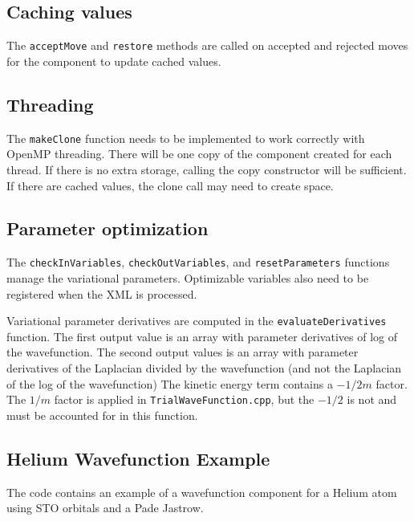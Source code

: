 \subsection{Caching values}
The \texttt{acceptMove} and \texttt{restore} methods are called on accepted and rejected moves for
the component to update cached values.


\subsection{Threading}
The \texttt{makeClone} function needs to be implemented to work correctly with OpenMP threading.
There will be one copy of the component created for each thread.
If there is no extra storage, calling the copy constructor will be sufficient.
If there are cached values, the clone call may need to create space.


\subsection{Parameter optimization}

The \texttt{checkInVariables}, \texttt{checkOutVariables}, and \texttt{resetParameters} functions manage the variational parameters.
Optimizable variables also need to be registered when the XML is processed.

Variational parameter derivatives are computed in the \texttt{evaluateDerivatives} function.
The first output value is an array with parameter derivatives of log of the wavefunction.
The second output values is an array with parameter derivatives of
the Laplacian divided by the wavefunction (and not the Laplacian of the log of the wavefunction)
The kinetic energy term contains a $-1/2m$ factor.
The $1/m$ factor is applied in \texttt{TrialWaveFunction.cpp}, but the $-1/2$ is not and must be accounted for in this function.




\subsection{Helium Wavefunction Example}\label{sec:helium_wavefunction_example}
The code contains an example of a wavefunction component for a Helium atom using STO orbitals and a Pade Jastrow.

